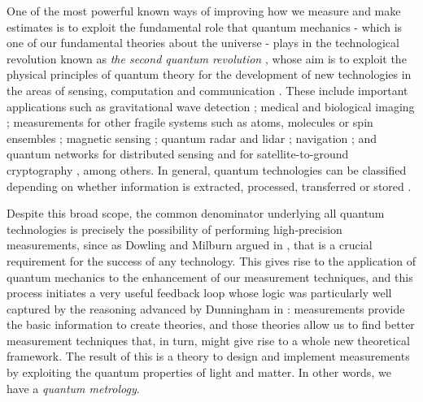 One of the most powerful known ways of improving how we measure and make estimates is to exploit the fundamental role that quantum mechanics - which is one of our fundamental theories about the universe - plays in the technological revolution known as \emph{the second quantum revolution} \cite{dowling2003}, whose aim is to exploit the physical principles of quantum theory for the development of new technologies in the areas of sensing, computation and communication \cite{degen2017, browne2017, barnett2017, acin2018}. These include important applications such as gravitational wave detection \cite{aasi2013, pitkin2011}; medical and biological imaging \cite{taylor2013, taylor2015, taylor2016}; measurements for other fragile systems such as atoms, molecules or spin ensembles \cite{eckert2007, pototschnig2011, carlton2010, wolfgramm2013, PaulProctor2016}; magnetic sensing \cite{baumgart2016}; quantum radar \cite{shabir2015, kebei2013, lanzagorta2012} and lidar \cite{lanzagorta2012, wang2016, zhuang2017}; navigation \cite{Dowling1998}; and quantum networks for distributed sensing \cite{proctor2017networked, proctor2017networkedshort, ge2018, eldredge2018, altenburg2018, qian2019} and for satellite-to-ground cryptography \cite{liao2017}, among others. In general, quantum technologies can be classified depending on whether information is extracted, processed, transferred or stored \cite{samuel2018}. 

Despite this broad scope, the common denominator underlying all quantum technologies is precisely the possibility of performing high-precision measurements, since as Dowling and Milburn argued in \cite{dowling2003}, that is a crucial requirement for the success of any technology. This gives rise to the application of quantum mechanics to the enhancement of our measurement techniques, and this process initiates a very useful feedback loop whose logic was particularly well captured by the reasoning advanced by Dunningham in \cite{dunningham2006}: measurements provide the basic information to create theories, and those theories allow us to find better measurement techniques that, in turn, might give rise to a whole new theoretical framework. The result of this is a theory to design and implement measurements by exploiting the quantum properties of light and matter. In other words, we have a \emph{quantum metrology}.   

